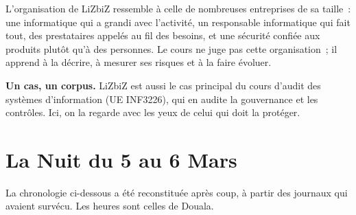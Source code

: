 L'organisation de LiZbiZ ressemble à celle de nombreuses entreprises de sa
taille~: une informatique qui a grandi avec l'activité, un responsable
informatique qui fait tout, des prestataires appelés au fil des besoins, et
une sécurité confiée aux produits plutôt qu'à des personnes. Le cours ne
juge pas cette organisation~; il apprend à la décrire, à mesurer ses
risques et à la faire évoluer.

\begin{boxinfo}
\textbf{Un cas, un corpus.} LiZbiZ est aussi le cas principal du cours
d'audit des systèmes d'information (UE INF3226), qui en audite la
gouvernance et les contrôles. Ici, on la regarde avec les yeux de celui
qui doit la protéger.
\end{boxinfo}

\section{La Nuit du 5 au 6 Mars}
\label{sec:p00-nuit}

La chronologie ci-dessous a été reconstituée après coup, à partir des
journaux qui avaient survécu. Les heures sont celles de Douala.

